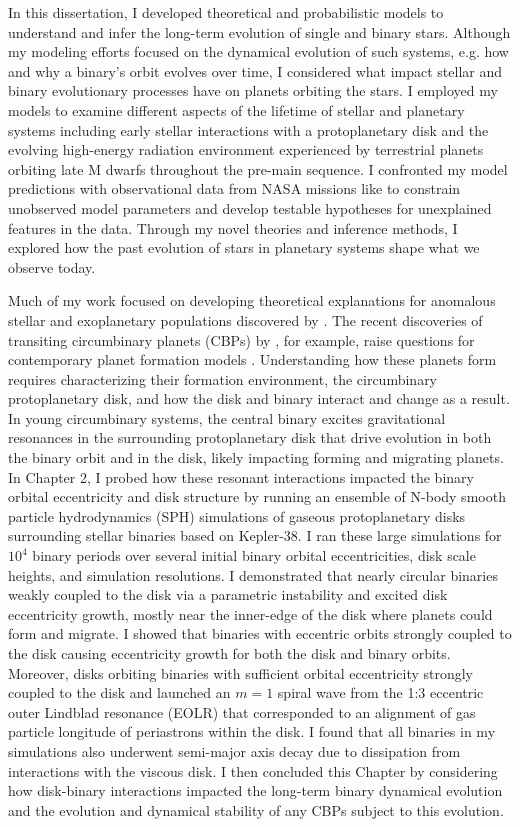 In this dissertation, I developed theoretical and probabilistic models to understand and infer the long-term evolution of single and binary stars. Although my modeling efforts focused on the dynamical evolution of such systems, e.g. how and why a binary's orbit evolves over time, I considered what impact stellar and binary evolutionary processes have on planets orbiting the stars. I employed my models to examine different aspects of the lifetime of stellar and planetary systems including early stellar interactions with a protoplanetary disk and the evolving high-energy radiation environment experienced by terrestrial planets orbiting late M dwarfs throughout the pre-main sequence. I confronted my model predictions with observational data from NASA missions like \kepler to constrain unobserved model parameters and develop testable hypotheses for unexplained features in the data. Through my novel theories and inference methods, I explored how the past evolution of stars in planetary systems shape what we observe today.

Much of my work focused on developing theoretical explanations for anomalous stellar and exoplanetary populations discovered by \kepler. The recent discoveries of transiting circumbinary planets (CBPs) by \kepler, for example, raise questions for contemporary planet formation models \citep[see][]{Welsh2014}.  Understanding how these planets form requires characterizing their formation environment, the circumbinary protoplanetary disk, and how the disk and binary interact and change as a result.  In young circumbinary systems, the central binary excites gravitational resonances in the surrounding protoplanetary disk that drive evolution in both the binary orbit and in the disk, likely impacting forming and migrating planets.  In Chapter 2, I probed how these resonant interactions impacted the binary orbital eccentricity and disk structure by running an ensemble of N-body smooth particle hydrodynamics (SPH) simulations of gaseous protoplanetary disks surrounding stellar binaries based on Kepler-38. I ran these large simulations for $10^4$ binary periods over several initial binary orbital eccentricities, disk scale heights, and simulation resolutions.  I demonstrated that nearly circular binaries weakly coupled to the disk via a parametric instability and excited disk eccentricity growth, mostly near the inner-edge of the disk where planets could form and migrate.  I showed that binaries with eccentric orbits strongly coupled to the disk causing eccentricity growth for both the disk and binary orbits. Moreover, disks orbiting binaries with sufficient orbital eccentricity strongly coupled to the disk and launched an $m = 1$ spiral wave from the 1:3 eccentric outer Lindblad resonance (EOLR) that corresponded to an alignment of gas particle longitude of periastrons within the disk. I found that all binaries in my simulations also underwent semi-major axis decay due to dissipation from interactions with the viscous disk. I then concluded this Chapter by considering how disk-binary interactions impacted the long-term binary dynamical evolution and the evolution and dynamical stability of any CBPs subject to this evolution. 

